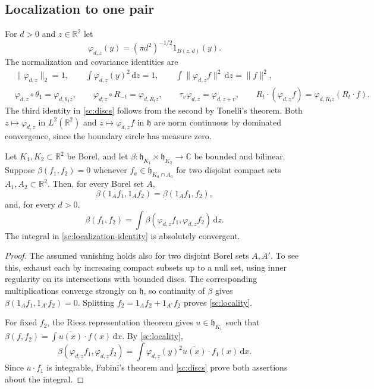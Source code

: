 \documentclass[11pt,letterpaper,reqno]{amsart}
\makeatletter
\theoremstyle{definition}
\newcommand{\ms@minorstart}{%
  \pushQED{\qed}\renewcommand{\qedsymbol}{$\blacksquare$}}
\newenvironment{lemma}[1][]{\ms@minorstart\ms@lemma[#1]}
  {\popQED\endms@lemma}
\theoremstyle{remark}
\makeatother
\begin{document}
\subsection{Localization to one pair}

For $d>0$ and $z\in\mathbb R^2$ let
\[
\varphi_{d,z}(y)=(\pi d^2)^{-1/2}1_{B(z,d)}(y).
\]
The normalization and covariance identities are
\begin{align}
&\|\varphi_{d,z}\|_2=1,\qquad
 \int\varphi_{d,z}(y)^2\,\mathrm dz=1,\qquad
 \int\|\varphi_{d,z}f\|^2\,\mathrm dz=\|f\|^2,
 \label{sc:discs}\\
&\varphi_{d,z}\circ\theta_1=\varphi_{d,\theta_1z},\qquad
 \varphi_{d,z}\circ R_{-t}=\varphi_{d,R_tz},\qquad
 \tau_v\varphi_{d,z}=\varphi_{d,z+v},\qquad
 R_t\cdot(\varphi_{d,z}f)=\varphi_{d,R_tz}(R_t\cdot f).
 \label{sc:disc-actions}
\end{align}
The third identity in \eqref{sc:discs} follows from the second by Tonelli's
theorem. Both $z\mapsto\varphi_{d,z}$ in $L^2(\mathbb R^2)$ and
$z\mapsto\varphi_{d,z}f$ in $\mathfrak h$ are norm continuous by
dominated convergence, since the boundary circle has measure zero.

\begin{lemma}[Localization of a bilinear form]\label{sc:localization}
Let $K_1,K_2\subset\mathbb R^2$ be Borel, and let
$\beta:\mathfrak h_{K_1}\times\mathfrak h_{K_2}\to\mathbb C$
be bounded and bilinear. Suppose $\beta(f_1,f_2)=0$ whenever
$f_a\in\mathfrak h_{K_a\cap A_a}$ for two disjoint compact sets
$A_1,A_2\subset\mathbb R^2$. Then, for every Borel set $A$,
\begin{equation}\label{sc:locality}
\beta(1_Af_1,1_Af_2)=\beta(1_Af_1,f_2),
\end{equation}
and, for every $d>0$,
\begin{equation}\label{sc:localization-identity}
\beta(f_1,f_2)=\int\beta(\varphi_{d,z}f_1,\varphi_{d,z}f_2)\,\mathrm dz.
\end{equation}
The integral in \eqref{sc:localization-identity} is absolutely convergent.
\end{lemma}

\begin{proof}
The assumed vanishing holds also for two disjoint Borel sets $A,A'$.
To see this, exhaust each by increasing compact subsets up to a null set,
using inner regularity on its intersections with bounded discs. The
corresponding multiplications converge strongly on $\mathfrak h$, so
continuity of $\beta$ gives $\beta(1_Af_1,1_{A'}f_2)=0$.
Splitting $f_2=1_Af_2+1_{A^c}f_2$ proves \eqref{sc:locality}.

For fixed $f_2$, the Riesz representation theorem gives
$u\in\mathfrak h_{K_1}$ such that
$\beta(f,f_2)=\int\overline{u(x)}\cdot f(x)\,\mathrm dx$.
By \eqref{sc:locality},
\[
\beta(\varphi_{d,z}f_1,\varphi_{d,z}f_2)
 =\int\varphi_{d,z}(y)^2\overline{u(x)}\cdot f_1(x)\,\mathrm dx.
\]
Since $\overline u\cdot f_1$ is integrable, Fubini's theorem and
\eqref{sc:discs} prove both assertions about the integral.
\end{proof}
\end{document}
